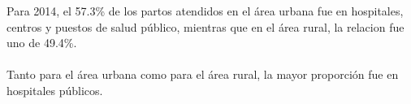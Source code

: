 Para 2014, el 57.3\% de los partos atendidos en el área urbana fue en hospitales, centros y puestos de salud público, mientras que en el área rural, la relacion fue uno de 49.4\%.\\\\ Tanto para el área urbana como para el área rural, la mayor proporción fue en hospitales públicos.
